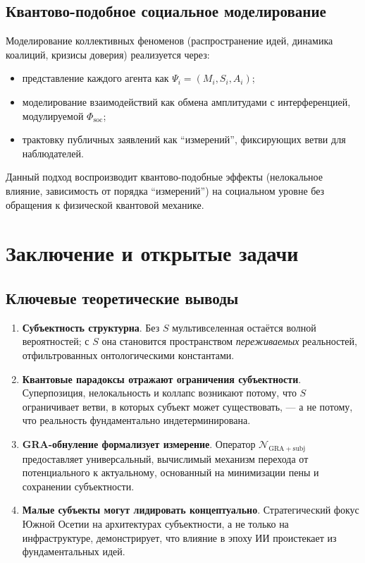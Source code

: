 \documentclass[11pt,a4paper]{article}
\theoremstyle{plain}
\theoremstyle{definition}
\theoremstyle{remark}
\newcommand{\PsiState}{\Psi}
\newcommand{\Foam}{\Phi}
\newcommand{\NullOp}{\mathcal{N}}
\newcommand{\Mmodel}{M}
\newcommand{\Ssubj}{S}
\newcommand{\Aactive}{A}
\newcommand{\Fsoc}{\Foam_{\mathrm{soc}}}
\begin{document}
\subsection{Квантово-подобное социальное моделирование}
Моделирование коллективных феноменов (распространение идей, динамика коалиций, кризисы доверия) реализуется через:
\begin{itemize}
    \item представление каждого агента как $\PsiState_i = (\Mmodel_i, \Ssubj_i, \Aactive_i)$;
    \item моделирование взаимодействий как обмена амплитудами с интерференцией, модулируемой $\Fsoc$;
    \item трактовку публичных заявлений как ``измерений'', фиксирующих ветви для наблюдателей.
\end{itemize}
Данный подход воспроизводит квантово-подобные эффекты (нелокальное влияние, зависимость от порядка ``измерений'') на социальном уровне без обращения к физической квантовой механике.

\section{Заключение и открытые задачи}
\label{sec:conclusions}

\subsection{Ключевые теоретические выводы}
\begin{enumerate}
    \item \textbf{Субъектность структурна}. Без $\Ssubj$ мультивселенная остаётся волной вероятностей; с $\Ssubj$ она становится пространством \textit{переживаемых} реальностей, отфильтрованных онтологическими константами.
    
    \item \textbf{Квантовые парадоксы отражают ограничения субъектности}. Суперпозиция, нелокальность и коллапс возникают потому, что $\Ssubj$ ограничивает ветви, в которых субъект может существовать, --- а не потому, что реальность фундаментально индетерминирована.
    
    \item \textbf{GRA-обнуление формализует измерение}. Оператор $\NullOp_{\mathrm{GRA+subj}}$ предоставляет универсальный, вычислимый механизм перехода от потенциального к актуальному, основанный на минимизации пены и сохранении субъектности.
    
    \item \textbf{Малые субъекты могут лидировать концептуально}. Стратегический фокус Южной Осетии на архитектурах субъектности, а не только на инфраструктуре, демонстрирует, что влияние в эпоху ИИ проистекает из фундаментальных идей.
\end{enumerate}
\end{document}
